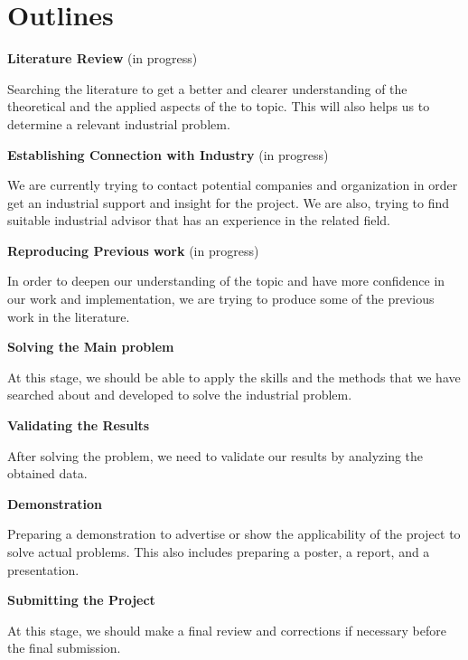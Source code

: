 \documentclass[a4paper, 12pt]{article}
\begin{document}
\newpage
\section*{Outlines}
\begin{itemize}
    {\item \textbf{Literature Review} {\footnotesize(in progress)}}

    Searching the literature to get a better and clearer understanding of the theoretical and the applied aspects of the to topic. This will also helps us to determine a relevant industrial problem.

    {\item \textbf{Establishing Connection with Industry}
    {\footnotesize(in progress)}}

    We are currently trying to contact potential companies and organization in order get an industrial support and insight for the project. We are also, trying to find suitable industrial advisor that has an experience in the related field.

    {\item \textbf{Reproducing Previous work} {\footnotesize(in progress)}}

    In order to deepen our understanding of the topic and have more confidence in our work and implementation, we are trying to produce some of the previous work in the literature.

    {\item \textbf{Solving the Main problem }}
    
    At this stage, we should be able to apply the skills and the methods that we have searched about and developed to solve the industrial problem.

     {\item \textbf{Validating the Results }}

     After solving the problem, we need to validate our results by analyzing the obtained data.

    {\item \textbf{Demonstration}} 

    Preparing a demonstration to advertise or show the applicability of the project to solve actual problems. This also includes preparing a poster, a report, and a presentation.

    {\item \textbf{Submitting the Project}} 
    
    At this stage, we should make a final review and corrections if necessary before the final submission.
    
    
    
\end{itemize}
\end{document}
